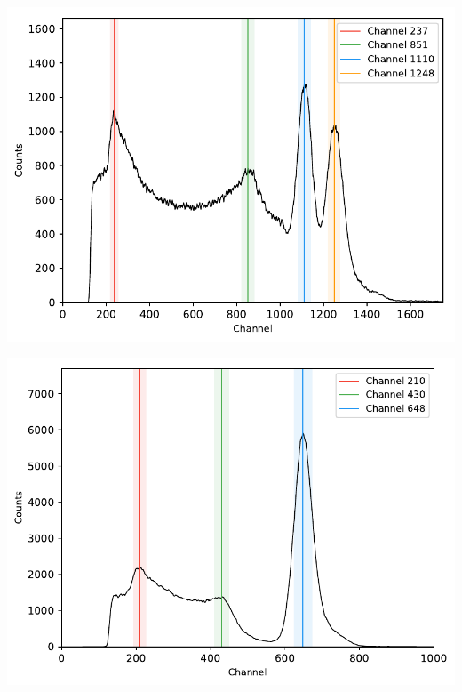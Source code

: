 \begin{multicols}{2}
\begin{center}
\begin{adjustbox}{max width=\linewidth, keepaspectratio}
        \end{adjustbox}
        \label{fig:137CsDecayScheme}
    \end{center}
\endminipage
%
\vspace{10mm}
%
\minipage{\linewidth}
    \begin{center}
        \captionsetup{type=figure}
        \begin{adjustbox}{max width=\linewidth, keepaspectratio}
            \includegraphics[]{pdf/60Co}
        \end{adjustbox}
        \label{fig:Spectrum60Co}
    \end{center}
\endminipage
%
\vspace{10mm}
%
\minipage{\linewidth}
    \begin{center}
        \captionsetup{type=figure}
        \begin{adjustbox}{max width=\linewidth, keepaspectratio}
            \includegraphics[]{pdf/137Cs}

\end{adjustbox}
\end{center}
\end{multicols}
